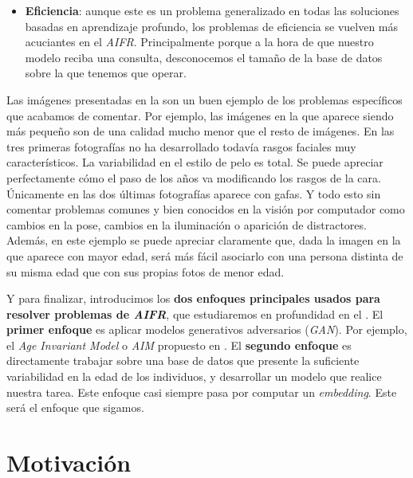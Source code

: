 \begin{itemize}
	\item \textbf{Eficiencia}: aunque este es un problema generalizado en todas las soluciones basadas en aprendizaje profundo, los problemas de eficiencia se vuelven más acuciantes en el \textit{AIFR}. Principalmente porque a la hora de que nuestro modelo reciba una consulta, desconocemos el tamaño de la base de datos sobre la que tenemos que operar.
\end{itemize}

Las imágenes presentadas en la  son un buen ejemplo de los problemas específicos que acabamos de comentar. Por ejemplo, las imágenes en la que aparece siendo más pequeño son de una calidad mucho menor que el resto de imágenes. En las tres primeras fotografías no ha desarrollado todavía rasgos faciales muy característicos. La variabilidad en el estilo de pelo es total. Se puede apreciar perfectamente cómo el paso de los años va modificando los rasgos de la cara. Únicamente en las dos últimas fotografías aparece con gafas. Y todo esto sin comentar problemas comunes y bien conocidos en la visión por computador como cambios en la pose, cambios en la iluminación o aparición de distractores. Además, en este ejemplo se puede apreciar claramente que, dada la imagen en la que aparece con mayor edad, será más fácil asociarlo con una persona distinta de su misma edad que con sus propias fotos de menor edad.

Y para finalizar, introducimos los \textbf{dos enfoques principales usados para resolver problemas de \textit{AIFR}}, que estudiaremos en profundidad en  el . El \textbf{primer enfoque} es aplicar modelos generativos adversarios (\textit{GAN}). Por ejemplo, el \textit{Age Invariant Model} o \textit{AIM} propuesto en \cite{informatica:tecnica_sintesis_aifr}. El \textbf{segundo enfoque} es directamente trabajar sobre una base de datos que presente la suficiente variabilidad en la edad de los individuos, y desarrollar un modelo que realice nuestra tarea. Este enfoque casi siempre pasa por computar un \textit{embedding}. Este será el enfoque que sigamos.

\section{Motivación}

